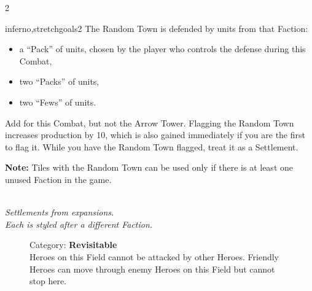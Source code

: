 \begin{multicols}{2}
\begin{expansion}[before=\vspace*{-11mm}]{inferno,stretchgoals2}
  The Random Town is defended by units from that Faction:
  \begin{itemize}
    \item a ``Pack'' of  units, chosen by the player who controls the defense during this Combat,
    \item two ``Packs'' of  units,
    \item two ``Fews'' of  units.
  \end{itemize}
  Add  for this Combat, but not the Arrow Tower.
  Flagging the Random Town increases  production by 10, which is also gained immediately if you are the first to flag it.
  While you have the Random Town flagged, treat it as a Settlement.

  \medskip
  \textbf{Note:} Tiles with the Random Town can be used only if there is at least one unused Faction in the game.
\end{expansion}

\end{multicols}

\vfill
\begin{center}
  \\
  \textit{Settlements from expansions.\\
     Each is styled after a different Faction.
   }
\end{center}
\pagebreak


\begin{figure}[H]
  \begin{minipage}[t]{0.47\textwidth}
    \vspace{0pt}
    \centering
    \caption{\small Category: \textbf{Revisitable}\\
      Gain 1 .
      It lasts for only one Turn.
      See \protect{}.
    }
  \end{minipage}\hfill
  \begin{minipage}[t]{0.47\textwidth}
    \vspace{0pt}
    \centering
    \caption{\small Category: \textbf{Revisitable}\\
      Heroes on this Field cannot be attacked by other Heroes.
      Friendly Heroes can move through enemy Heroes on this Field but cannot stop here.}
  \end{minipage}
\end{figure}

